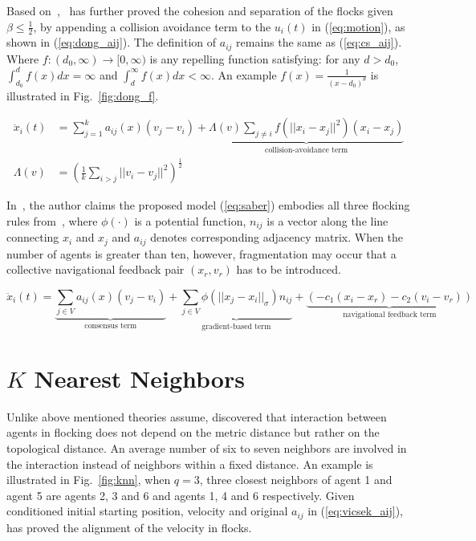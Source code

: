 Based on~\cite{CuckerSmale2007},~\cite{CuckerDong2010} has further proved the cohesion and separation of the flocks given $\beta\leq\frac{1}{2}$, by appending a collision avoidance term to the $u_i(t)$ in (\ref{eq:motion}), as shown in (\ref{eq:dong_aij}). The definition of $a_{ij}$ remains the same as (\ref{eq:cs_aij}). Where $f:(d_0,\infty)\to[0,\infty)$ is any repelling function satisfying: for any $d>d_0$, $\int_{d_0}^d f(x)dx=\infty$ and $\int_d^{\infty} f(x)dx<\infty$. An example $f(x)=\frac{1}{(x-d_0)^{\theta}}$ is illustrated in Fig.~\ref{fig:dong_f}.

\begin{equation}\label{eq:dong_aij}
\begin{aligned}
\ddot{x}_i(t)&=\sum^k_{j=1}a_{ij}(x)(v_j-v_i)+\underbrace{\Lambda(v)\sum_{j\neq i}f(||x_i-x_j||^2)(x_i-x_j)}_{\text{collision-avoidance term}}\\
\Lambda(v)&=(\frac{1}{k}\sum_{i>j}||v_i-v_j||^2)^{\frac{1}{2}}
\end{aligned}
\end{equation}

In~\cite{Saber2004}, the author claims the proposed model (\ref{eq:saber}) embodies all three flocking rules from~\cite{Reynolds1987}, where $\phi(\cdot)$ is a potential function, $n_{ij}$ is a vector along the line connecting $x_i$ and $x_j$ and $a_{ij}$ denotes corresponding adjacency matrix. When the number of agents is greater than ten, however, fragmentation may occur that a collective navigational feedback pair $(x_r, v_r)$ has to be introduced.

\begin{equation}\label{eq:saber}
\ddot{x}_i(t)=\underbrace{\sum_{j\in V}a_{ij}(x)(v_j-v_i)}_{\text{consensus term}}+\underbrace{\sum_{j\in V}\phi(||x_j-x_i||_{\sigma})n_{ij}}_{\text{gradient-based term}}+\underbrace{(-c_1(x_i-x_r)-c_2(v_i-v_r))}_{\text{navigational feedback term}}
\end{equation}

\section{$K$ Nearest Neighbors}

Unlike above mentioned theories assume, \cite{PNAS} discovered that interaction between agents in flocking does not depend on the metric distance but rather on the topological distance. An average number of six to seven neighbors are involved in the interaction instead of neighbors within a fixed distance. An example is illustrated in Fig.~\ref{fig:knn}, when $q=3$, three closest neighbors of agent 1 and agent 5 are agents 2, 3 and 6 and agents 1, 4 and 6 respectively. Given conditioned initial starting position, velocity and original $a_{ij}$ in (\ref{eq:vicsek_aij}),~\cite{KNN} has proved the alignment of the velocity in flocks.

